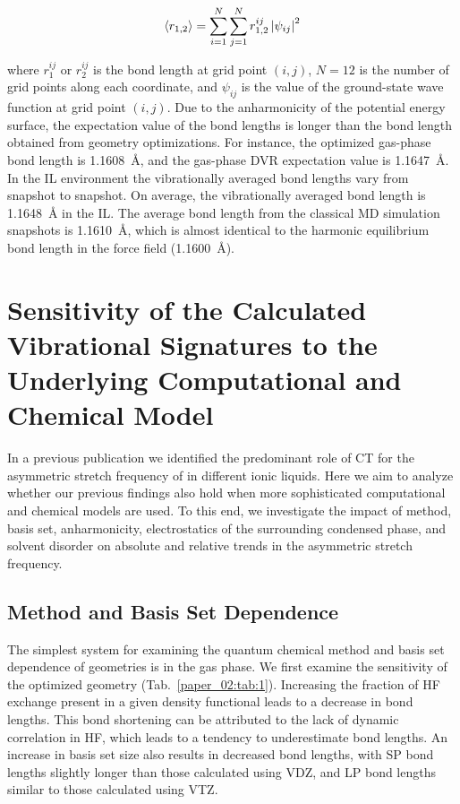 \begin{equation}
  \label{paper_02:eq:3}
  \Braket{ r_{1,2} } = \sum_{i = 1}^{N} \sum_{j = 1}^{N} r_{1,2}^{ij}\left| \psi_{ij} \right|^{2}
\end{equation}

where \(r_{1}^{ij}\) or \(r_{2}^{ij}\) is the bond length at grid point \((i,j)\), \(N = 12\) is the number of grid points along each coordinate, and \(\psi_{ij}\) is the value of the ground-state wave function at grid point \((i,j)\). Due to the anharmonicity of the potential energy surface, the expectation value of the bond lengths is longer than the bond length obtained from geometry optimizations. For instance, the optimized gas-phase bond length is \SI{1.1608}{\angstrom}, and the gas-phase DVR expectation value is \SI{1.1647}{\angstrom}. In the IL environment the vibrationally averaged  bond lengths vary from snapshot to snapshot. On average, the vibrationally averaged  bond length is \SI{1.1648}{\angstrom} in the IL. The average bond length from the classical MD simulation snapshots is \SI{1.1610}{\angstrom}, which is almost identical to the harmonic equilibrium bond length in the force field (\SI{1.1600}{\angstrom}).

\section{Sensitivity of the Calculated Vibrational Signatures to the Underlying Computational and Chemical Model}
\label{paper_02:sec:III}

In a previous publication\cite{Brinzer2015} we identified the predominant role of CT for the asymmetric stretch frequency of  in different ionic liquids. Here we aim to analyze whether our previous findings also hold when more sophisticated computational and chemical models are used. To this end, we investigate the impact of method, basis set, anharmonicity, electrostatics of the surrounding condensed phase, and solvent disorder on absolute and relative trends in the  asymmetric stretch frequency.

\subsection{Method and Basis Set Dependence}
\label{paper_02:ssec:IIIA}

The simplest system for examining the quantum chemical method and basis set dependence of geometries is  in the gas phase. We first examine the sensitivity of the optimized geometry (Tab.~\ref{paper_02:tab:1}). Increasing the fraction of HF exchange present in a given density functional leads to a decrease in bond lengths. This bond shortening can be attributed to the lack of dynamic correlation in HF, which leads to a tendency to underestimate bond lengths. An increase in basis set size also results in decreased bond lengths, with SP bond lengths slightly longer than those calculated using VDZ, and LP bond lengths similar to those calculated using VTZ.

